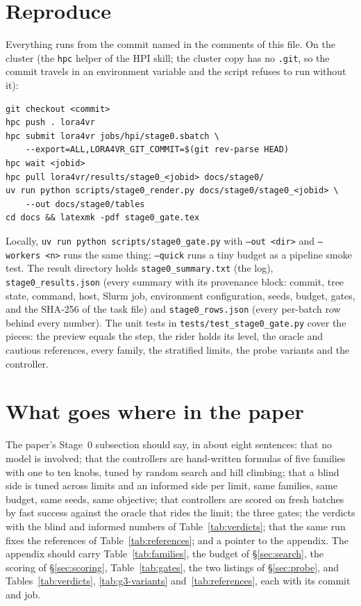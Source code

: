 \documentclass[11pt,a4paper]{article}
\begin{document}
\section{Reproduce}
\label{sec:reproduce}
\sloppy
Everything runs from the commit named in the comments of this file. On the
cluster (the \texttt{hpc} helper of the HPI skill; the cluster copy has no
\texttt{.git}, so the commit travels in an environment variable and the
script refuses to run without it):
\begin{scriptsize}
\begin{verbatim}
git checkout <commit>
hpc push . lora4vr
hpc submit lora4vr jobs/hpi/stage0.sbatch \
    --export=ALL,LORA4VR_GIT_COMMIT=$(git rev-parse HEAD)
hpc wait <jobid>
hpc pull lora4vr/results/stage0_<jobid> docs/stage0/
uv run python scripts/stage0_render.py docs/stage0/stage0_<jobid> \
    --out docs/stage0/tables
cd docs && latexmk -pdf stage0_gate.tex
\end{verbatim}
\end{scriptsize}
Locally, \texttt{uv run python scripts/stage0\_gate.py} with \texttt{--out <dir>}
and \texttt{--workers <n>} runs the same thing; \texttt{--quick} runs a tiny budget as a pipeline
smoke test. The result directory holds \texttt{stage0\_summary.txt} (the
log), \texttt{stage0\_results.json} (every summary with its provenance
block: commit, tree state, command, host, Slurm job, environment
configuration, seeds, budget, gates, and the SHA-256 of the task file) and
\texttt{stage0\_rows.json} (every per-batch row behind every number). The
unit tests in \texttt{tests/test\_stage0\_gate.py} cover the pieces: the
preview equals the step, the rider holds its level, the oracle and cautious
references, every family, the stratified limits, the probe variants and the
controller.
\fussy

\section{What goes where in the paper}
\label{sec:where}

The paper's Stage~0 subsection should say, in about eight sentences: that no
model is involved; that the controllers are hand-written formulas of five
families with one to ten knobs, tuned by random search and hill climbing;
that a blind side is tuned across limits and an informed side per limit,
same families, same budget, same seeds, same objective; that controllers are
scored on fresh batches by fast success against the oracle that rides the
limit; the three gates; the verdicts with the blind and informed numbers of
Table~\ref{tab:verdicts}; that the same run fixes the references of
Table~\ref{tab:references}; and a pointer to the appendix. The appendix
should carry Table~\ref{tab:families}, the budget of \S\ref{sec:search}, the
scoring of \S\ref{sec:scoring}, Table~\ref{tab:gates}, the two listings of
\S\ref{sec:probe}, and Tables~\ref{tab:verdicts}, \ref{tab:g3-variants}
and~\ref{tab:references}, each with its commit and job.
\end{document}
